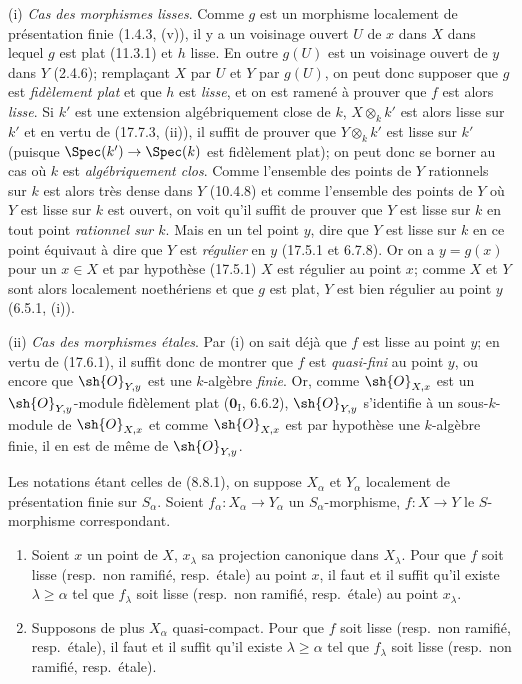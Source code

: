 (i) \emph{Cas des morphismes lisses}. Comme $g$ est un morphisme localement de présentation finie (1.4.3, (v)), il y a un voisinage ouvert $U$ de $x$ dans $X$ dans lequel $g$ est plat (11.3.1) et $h$ lisse. En outre $g(U)$ est un voisinage ouvert de $y$ dans $Y$ (2.4.6); remplaçant $X$ par $U$ et $Y$ par $g(U)$, on peut donc supposer que $g$ est \emph{fidèlement plat} et que $h$ est \emph{lisse}, et on est ramené à prouver que $f$ est alors \emph{lisse}. Si $k'$ est une extension algébriquement
close de $k$, $X\otimes_k k'$ est alors lisse sur $k'$ et en vertu de (17.7.3, (ii)), il suffit de prouver que $Y\otimes_k k'$ est lisse sur $k'$ (puisque $\Spec(k')\to\Spec(k)$ est fidèlement plat); on peut donc se borner au cas où $k$ est \emph{algébriquement clos}. Comme l'ensemble des points de $Y$ rationnels sur $k$ est alors très dense dans $Y$ (10.4.8) et comme l'ensemble des points de $Y$ où $Y$ est lisse sur $k$ est ouvert, on voit qu'il suffit de prouver que $Y$ est lisse sur $k$ en tout point \emph{rationnel sur $k$}. Mais en un tel point $y$, dire que $Y$ est lisse sur $k$ en ce point équivaut à dire que $Y$ est \emph{régulier} en $y$ (17.5.1 et 6.7.8). Or on a $y=g(x)$ pour un $x\in X$ et par hypothèse (17.5.1) $X$ est régulier au point $x$; comme $X$ et $Y$ sont alors localement noethériens et que $g$ est plat, $Y$ est bien régulier au point $y$ (6.5.1, (i)).

(ii) \emph{Cas des morphismes étales}. Par (i) on sait déjà que $f$ est lisse au point $y$; en vertu de (17.6.1), il suffit donc de montrer que $f$ est \emph{quasi-fini} au point $y$, ou encore que $\sh{O}_{Y,y}$ est une $k$-algèbre \emph{finie}. Or, comme $\sh{O}_{X,x}$ est un $\sh{O}_{Y,y}$-module fidèlement plat ($\mathbf{0}_{\mathrm I}$, 6.6.2), $\sh{O}_{Y,y}$ s'identifie à un sous-$k$-module de $\sh{O}_{X,x}$ et comme $\sh{O}_{X,x}$ est par hypothèse une $k$-algèbre finie, il en est de même de $\sh{O}_{Y,y}$.

\begin{proposition}[17.7.8]
\label{IV.17.7.8}
Les notations étant celles de \textup{(8.8.1)}, on suppose $X_\alpha$ et $Y_\alpha$ localement de présentation finie sur $S_\alpha$. Soient $f_\alpha:X_\alpha\to Y_\alpha$ un $S_\alpha$-morphisme, $f:X\to Y$ le $S$-morphisme correspondant.
\begin{enumerate}
  \item[\textup{(i)}] Soient $x$ un point de $X$, $x_\lambda$ sa projection canonique dans $X_\lambda$. Pour que $f$ soit lisse \textup{(resp.}\ non ramifié, \textup{resp.}\ étale\textup{)} au point $x$, il faut et il suffit qu'il existe $\lambda\geq\alpha$ tel que $f_\lambda$ soit lisse \textup{(resp.}\ non ramifié, \textup{resp.}\ étale\textup{)} au point $x_\lambda$.
  \item[\textup{(ii)}] Supposons de plus $X_\alpha$ quasi-compact. Pour que $f$ soit lisse \textup{(resp.}\ non ramifié, \textup{resp.}\ étale\textup{)}, il faut et il suffit qu'il existe $\lambda\geq\alpha$ tel que $f_\lambda$ soit lisse \textup{(resp.}\ non ramifié, \textup{resp.}\ étale\textup{)}.
\end{enumerate}
\end{proposition}

